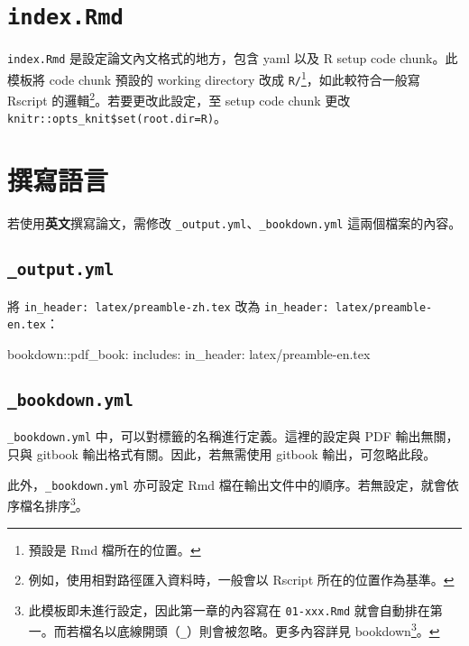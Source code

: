 \documentclass[oneside]{book}
\newenvironment{Shaded}{\begin{snugshade}}{\end{snugshade}}
\newcommand{\AttributeTok}[1]{\textcolor[rgb]{0.77,0.63,0.00}{#1}}
\newcommand{\FunctionTok}[1]{\textcolor[rgb]{0.00,0.00,0.00}{#1}}
\renewcommand{\href}[2]{#2\footnote{\url{#1}}}
\begin{document}
\hypertarget{index-rmd}{%
\section{\texorpdfstring{\texttt{index.Rmd}}{index.Rmd}}\label{index-rmd}}

\texttt{index.Rmd} 是設定論文內文格式的地方，包含 yaml 以及 R setup code chunk。此模板將 code chunk 預設的 working directory 改成 \texttt{R/}\footnote{預設是 Rmd 檔所在的位置。}，如此較符合一般寫 Rscript 的邏輯\footnote{例如，使用相對路徑匯入資料時，一般會以 Rscript 所在的位置作為基準。}。若要更改此設定，至 setup code chunk 更改 \texttt{knitr::opts\_knit\$set(root.dir=\textquotesingle{}R\textquotesingle{})}。

\hypertarget{write-lang}{%
\section{撰寫語言}\label{write-lang}}

若使用\textbf{英文}撰寫論文，需修改 \texttt{\_output.yml}、\texttt{\_bookdown.yml} 這兩個檔案的內容。

\hypertarget{output.yml-1}{%
\subsection{\texorpdfstring{\texttt{\_output.yml}}{\_output.yml}}\label{output.yml-1}}

將 \texttt{in\_header:\ latex/preamble-zh.tex} 改為 \texttt{in\_header:\ latex/preamble-en.tex}：

\begin{Shaded}
\begin{Highlighting}[]
\FunctionTok{bookdown:}\AttributeTok{:pdf_book:}
  \FunctionTok{includes:}
    \FunctionTok{in_header:}\AttributeTok{ latex/preamble-en.tex}
\end{Highlighting}
\end{Shaded}

\hypertarget{bookdown.yml-1}{%
\subsection{\texorpdfstring{\texttt{\_bookdown.yml}}{\_bookdown.yml}}\label{bookdown.yml-1}}

\texttt{\_bookdown.yml} 中，可以對標籤的名稱進行定義。這裡的設定與 PDF 輸出無關，只與 gitbook 輸出格式有關。因此，若無需使用 gitbook 輸出，可忽略此段。

此外，\texttt{\_bookdown.yml} 亦可設定 Rmd 檔在輸出文件中的順序。若無設定，就會依序檔名排序\footnote{此模板即未進行設定，因此第一章的內容寫在 \texttt{01-xxx.Rmd} 就會自動排在第一。而若檔名以底線開頭（\texttt{\_}）則會被忽略。更多內容詳見 \href{https://bookdown.org/yihui/bookdown/usage.html}{bookdown}。}。
\end{document}
